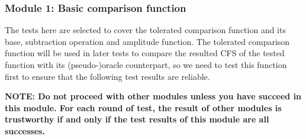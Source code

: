 \documentclass[12pt, titlepage]{article}
\begin{document}
\subsubsection{Module 1: Basic comparison function}

The tests here are selected to cover the tolerated comparison function and its
base, subtraction operation and amplitude function. The tolerated comparison
function will be used in later tests to compare the resulted CFS of the tested
function with its (pseudo-)oracle counterpart, so we need to test this function
first to ensure that the following test results are reliable.

\textbf{NOTE: Do not proceed with other modules unless you have succeed in this
module. For each round of test, the result of other modules is trustworthy if
and only if the test results of this module are all successes.}
\end{document}
